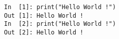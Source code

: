 \documentclass{article}
\begin{document}
 
\begin{lstlisting} 
In  [1]: print("Hello World !") 
Out [1]: Hello World ! 
In  [2]: print("Hello World !") 
Out [2]: Hello World ! 
\end{lstlisting} 
\end{document}
